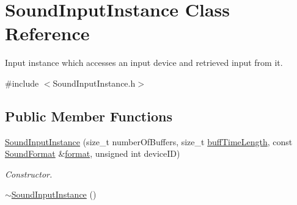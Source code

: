 \hypertarget{class_sound_input_instance}{
\section{SoundInputInstance Class Reference}
\label{class_sound_input_instance}
}


Input instance which accesses an input device and retrieved input from it.  




{\ttfamily \#include $<$SoundInputInstance.h$>$}

\subsection*{Public Member Functions}
\begin{DoxyCompactItemize}
\item 
\hyperlink{class_sound_input_instance_a1903cf04e9880bc78bfe6760b487537a}{SoundInputInstance} (size\_\-t numberOfBuffers, size\_\-t \hyperlink{class_sound_input_instance_a3c7af70300e1f3da9b51ff0cf7222bb4}{buffTimeLength}, const \hyperlink{class_sound_format}{SoundFormat} \&\hyperlink{class_sound_input_instance_a10c705a8d08cc30306efe5c9ff45e567}{format}, unsigned int deviceID)
\begin{DoxyCompactList}\small\item\em Constructor. \item\end{DoxyCompactList}\item 
\hypertarget{class_sound_input_instance_a1da471750dc7f2cc93d1dd874493ebb3}{
\hyperlink{class_sound_input_instance_a1da471750dc7f2cc93d1dd874493ebb3}{$\sim$SoundInputInstance} ()}
\label{class_sound_input_instance_a1da471750dc7f2cc93d1dd874493ebb3}


\end{DoxyCompactItemize}

